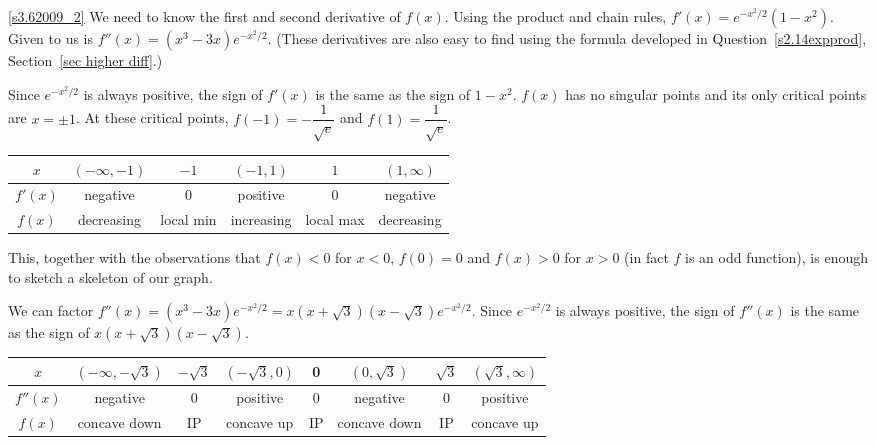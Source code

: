 \begin{solution}

\eqref{s3.62009_2}  We need to know the first and second derivative of $f(x)$. Using the product and chain rules, $f'(x)=e^{-x^2/2}(1-x^2)$. Given to us is $f''(x) = (x^3-3x)e^{-x^2/2}$. (These derivatives are also easy to find using the formula developed in Question~\ref{s2.14expprod}, Section~\ref*{sec higher diff}.)%

Since $e^{-x^2/2}$ is always positive, the sign of $f'(x)$ is the same as the sign of $1-x^2$. $f(x)$ has no singular points and its only critical points are $x=\pm 1$. At these critical points, $f(-1)=-\dfrac{1}{\sqrt{e}}$ and $f(1)=\dfrac{1}{\sqrt{e}}$.
\begin{center}
\begin{tabular}{|c||c|c|c|c|c|}
\hline
$x$&$(-\infty,-1)$&$-1$&$(-1,1)$&$1$&$(1,\infty)$\\
\hline
$f'(x)$&negative&0&positive&0&negative\\
\hline
$f(x)$&decreasing&local min&increasing&local max&decreasing\\
\hline
\end{tabular}
\end{center}

This, together with the observations that $f(x)<0$ for $x<0$,
          $f(0)=0$ and $f(x)>0$ for $x>0$ (in fact $f$ is an odd function),
          is enough to sketch a skeleton of our graph.

\begin{center}\end{center}


We can factor $f''(x) = (x^3-3x)e^{-x^2/2}=x(x+\sqrt{3})(x-\sqrt{3})e^{-x^2/2}$. Since $e^{-x^2/2}$ is always positive, the sign of $f''(x)$ is the same as the sign of $x(x+\sqrt{3})(x-\sqrt{3})$.

\begin{center}
\begin{tabular}{|c||c|c|c|c|c|c|c|}
\hline
$x$&$(-\infty,-\sqrt{3})$&$-\sqrt{3}$&$(-\sqrt{3},0)$
&0&$(0,\sqrt{3})$
&$\sqrt{3}$&$(\sqrt{3},\infty)$\\
\hline
$f''(x)$&negative&0&positive&0&negative&0&positive\\
\hline
$f(x)$&concave down&IP&concave up&IP&concave down&IP&concave up\\
\hline
\end{tabular}
\end{center}


\end{solution}

